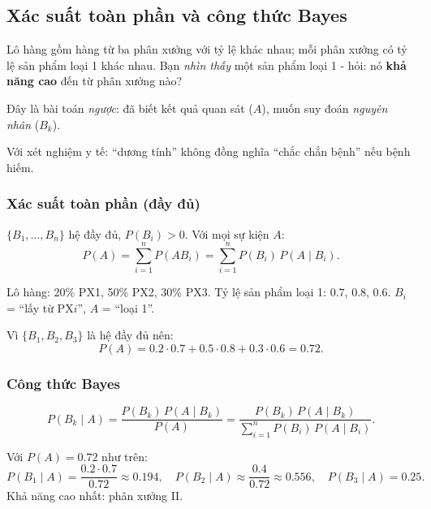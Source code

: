 \documentclass[12pt,a4paper]{article}
\begin{document}
\subsection{Xác suất toàn phần và công thức Bayes}

\begin{dongco}[title={Động cơ học -- Sản phẩm đến từ phân xưởng nào?}]
Lô hàng gồm hàng từ ba phân xưởng với tỷ lệ khác nhau; mỗi phân xưởng có tỷ lệ sản phẩm loại 1 khác nhau. Bạn \emph{nhìn thấy} một sản phẩm loại 1 - hỏi: nó \textbf{khả năng cao} đến từ phân xưởng nào?

Đây là bài toán \emph{ngược}: đã biết kết quả quan sát ($A$), muốn suy đoán \emph{nguyên nhân} ($B_k$).

Với xét nghiệm y tế: ``dương tính'' không đồng nghĩa ``chắc chắn bệnh'' nếu bệnh hiếm.
\end{dongco}

\subsubsection{Xác suất toàn phần (đầy đủ)}

\begin{dinhnghia}
$\{B_1, \ldots, B_n\}$ hệ đầy đủ, $P(B_i) > 0$. Với mọi sự kiện $A$:
\[
  P(A) = \displaystyle\sum_{i=1}^{n} P(AB_i) = \displaystyle\sum_{i=1}^{n} P(B_i)\,P(A \mid B_i).
\]
\end{dinhnghia}

\begin{vidu}[title={Ba phân xưởng}]
Lô hàng: 20\% PX1, 50\% PX2, 30\% PX3. Tỷ lệ sản phẩm loại 1: $0.7$, $0.8$, $0.6$. $B_i$ = ``lấy từ PX$i$'', $A$ = ``loại 1''.

Vì $\{B_1, B_2, B_3\}$ là hệ đầy đủ nên:
\[
  P(A) = 0.2 \cdot 0.7 + 0.5 \cdot 0.8 + 0.3 \cdot 0.6 = 0.72.
\]
\end{vidu}

\subsubsection{Công thức Bayes}

\begin{dinhnghia}
\[
  P(B_k \mid A) = \dfrac{P(B_k)\,P(A \mid B_k)}{P(A)} = \dfrac{P(B_k)\,P(A \mid B_k)}{\displaystyle\sum_{i=1}^{n} P(B_i)\,P(A \mid B_i)}.
\]
\end{dinhnghia}

\begin{vidu}[title={Sản phẩm loại 1 do PX nào?}]
Với $P(A) = 0.72$ như trên:
\[
  P(B_1 \mid A) = \dfrac{0.2 \cdot 0.7}{0.72} \approx 0.194,\quad
  P(B_2 \mid A) \approx \dfrac{0.4}{0.72} \approx 0.556,\quad
  P(B_3 \mid A) = 0.25.
\]
Khả năng cao nhất: phân xưởng II.
\end{vidu}
\end{document}
